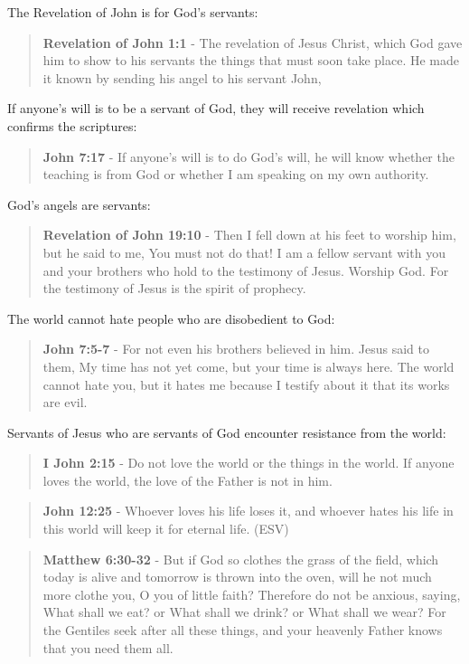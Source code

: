 \documentclass[11pt]{article}
\begin{document}
The Revelation of John is for God's servants:

\begin{quote}
\textbf{Revelation of John 1:1} - The revelation of Jesus Christ, which God gave him to show to his servants the things that must soon take place. He made it known by sending his angel to his servant John,
\end{quote}

If anyone's will is to be a servant of God, they will receive revelation which confirms the scriptures:

\begin{quote}
\textbf{John 7:17} - If anyone's will is to do God's will, he will know whether the teaching is from God or whether I am speaking on my own authority.
\end{quote}

God's angels are servants:

\begin{quote}
\textbf{Revelation of John 19:10} - Then I fell down at his feet to worship him, but he said to me, You must not do that! I am a fellow servant with you and your brothers who hold to the testimony of Jesus. Worship God. For the testimony of Jesus is the spirit of prophecy.
\end{quote}

The world cannot hate people who are disobedient to God:

\begin{quote}
\textbf{John 7:5-7} - For not even his brothers believed in him. Jesus said to them, My time has not yet come, but your time is always here. The world cannot hate you, but it hates me because I testify about it that its works are evil.
\end{quote}

Servants of Jesus who are servants of God encounter resistance from the world:

\begin{quote}
\textbf{I John 2:15} - Do not love the world or the things in the world. If anyone loves the world, the love of the Father is not in him.
\end{quote}

\begin{quote}
\textbf{John 12:25} -  Whoever loves his life loses it, and whoever hates his life in this world will keep it for eternal life.  (ESV)
\end{quote}

\begin{quote}
\textbf{Matthew 6:30-32} - But if God so clothes the grass of the field, which today is alive and tomorrow is thrown into the oven, will he not much more clothe you, O you of little faith? Therefore do not be anxious, saying, What shall we eat? or What shall we drink? or What shall we wear? For the Gentiles seek after all these things, and your heavenly Father knows that you need them all.
\end{quote}
\end{document}

